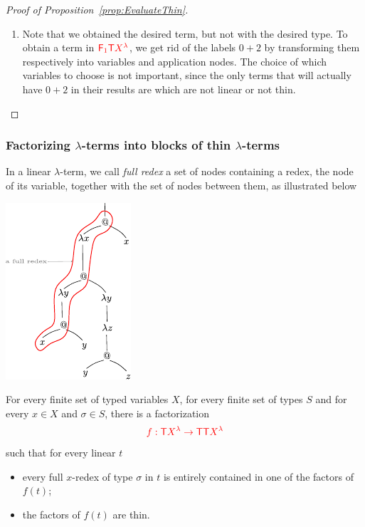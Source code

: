 \begin{proof}[Proof of Proposition~\ref{prop:EvaluateThin}]
\begin{enumerate}
\item Note that we obtained the desired term, but not with the desired type. To obtain a term in 
${\color{red}{{\color{red}{\mathsf F_{1}}}{\color{red}{\mathsf T}}{X^\lambda}}}$, we get rid of the labels $0+2$ by transforming them respectively into variables and application nodes. The choice of which variables to choose is not important, since the only terms that will actually have $0+2$ in their results are \lambdaterms which are not linear or not thin.
\end{enumerate}
\end{proof}

  



\subsubsection{Factorizing $\lambda$-terms into blocks of thin $\lambda$-terms}\label{subsub:facto}

In a linear $\lambda$-term, we call \emph{full redex} a set of nodes  containing a redex, the node of its variable, together with the set of nodes between them, as illustrated below
\begin{center}
\includegraphics[scale=1.2]{pictures/full-redex.pdf}
\end{center}


\begin{proposition}\label{prop:FactoIntoThin} For every finite set of typed variables $X$, for every finite set of types $S$ and for every $x\in X$ and $\sigma\in S$, there is a factorization $${\color{red}{f:{\color{red}{\mathsf T}}{\color{red}{X^\lambda}} \to {\color{red}{\mathsf T}}{\color{red}{\mathsf T}}{\color{red}{X^\lambda}}}}$$ 
such that for every linear \lambdaterm $t$
\begin{itemize}
\item every full $x$-redex of type $\sigma$ in $t$ is entirely contained in one of the factors of $f(t)$;
\item the factors of $f(t)$ are thin.
\end{itemize}
\end{proposition}

